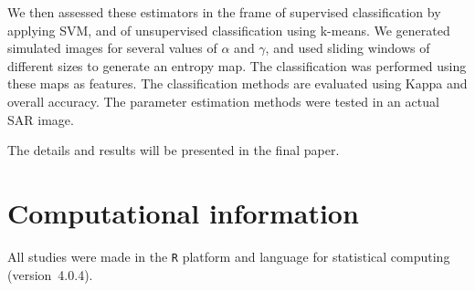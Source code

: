 \documentclass[journal]{IEEEtran}
\begin{document}
We then assessed these estimators in the frame of supervised classification by applying SVM, and of unsupervised classification using k-means. 
We generated simulated images for several values of $\alpha$ and $\gamma$, and used sliding windows of different sizes to generate an entropy map. 
The classification was performed using these maps as features. 
The classification methods are evaluated using Kappa and overall accuracy. 
The parameter estimation methods were tested in an actual SAR image. 

The details and results will be presented in the final paper.






\section{Computational information}
\label{conclusion}



All studies were made in the \texttt R platform and language for statistical computing~\cite{RLanguage} (version~4.0.4).




\end{document}

